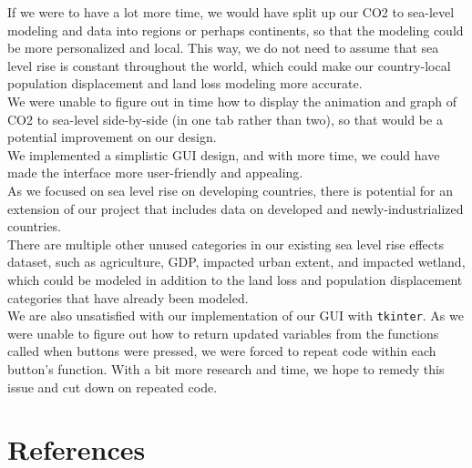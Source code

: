 \documentclass[fontsize=11pt]{article}
\begin{document}
If we were to have a lot more time, we would have split up our CO2 to sea-level modeling and data into regions or perhaps continents, so that the modeling could be more personalized and local. This way, we do not need to assume that sea level rise is constant throughout the world, which could make our country-local population displacement and land loss modeling more accurate.\\

We were unable to figure out in time how to display the animation and graph of CO2 to sea-level side-by-side (in one tab rather than two), so that would be a potential improvement on our design.\\

We implemented a simplistic GUI design, and with more time, we could have made the interface more user-friendly and appealing.\\

As we focused on sea level rise on developing countries, there is potential for an extension of our project that includes data on developed and newly-industrialized countries.\\

There are multiple other unused categories in our existing sea level rise effects dataset, such as agriculture, GDP, impacted urban extent, and impacted wetland, which could be modeled in addition to the land loss and population displacement categories that have already been modeled. \\

We are also unsatisfied with our implementation of our GUI with \texttt{tkinter}. As we were unable to figure out how to return updated variables from the functions called when buttons were pressed, we were forced to repeat code within each button’s function. With a bit more research and time, we hope to remedy this issue and cut down on repeated code.


\newpage
\section*{References}
\end{document}
